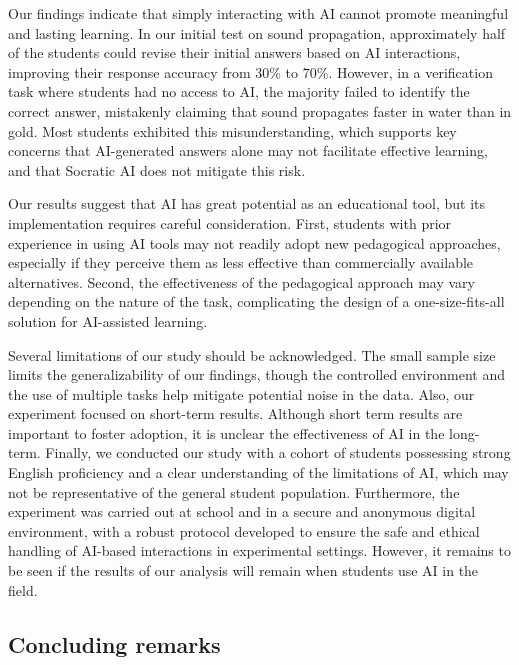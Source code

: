 \documentclass[
  11pt,
]{article}
\begin{document}
Our findings indicate that simply interacting with AI cannot promote meaningful and lasting learning. In our initial test on sound propagation, approximately half of the students could revise their initial answers based on AI interactions, improving their response accuracy from 30\% to 70\%. However, in a verification task where students had no access to AI, the majority failed to identify the correct answer, mistakenly claiming that sound propagates faster in water than in gold. Most students exhibited this misunderstanding, which supports key concerns that AI-generated answers alone may not facilitate effective learning, and that Socratic AI does not mitigate this risk.

Our results suggest that AI has great potential as an educational tool, but its implementation requires careful consideration. First, students with prior experience in using AI tools may not readily adopt new pedagogical approaches, especially if they perceive them as less effective than commercially available alternatives. Second, the effectiveness of the pedagogical approach may vary depending on the nature of the task, complicating the design of a one-size-fits-all solution for AI-assisted learning.

Several limitations of our study should be acknowledged. The small sample size limits the generalizability of our findings, though the controlled environment and the use of multiple tasks help mitigate potential noise in the data. Also, our experiment focused on short-term results. Although short term results are important to foster adoption, it is unclear the effectiveness of AI in the long-term. Finally, we conducted our study with a cohort of students possessing strong English proficiency and a clear understanding of the limitations of AI, which may not be representative of the general student population. Furthermore, the experiment was carried out at school and in a secure and anonymous digital environment, with a robust protocol developed to ensure the safe and ethical handling of AI-based interactions in experimental settings. However, it remains to be seen if the results of our analysis will remain when students use AI in the field.

\subsection{Concluding remarks}\label{concluding-remarks}
\end{document}
